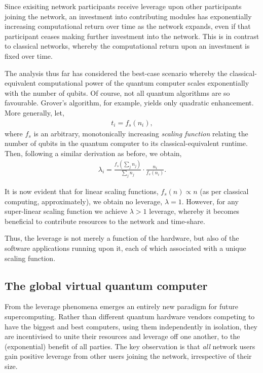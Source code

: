 \documentclass[aps,rmp,twocolumn,amsmath,amssymb,nofootinbib,superscriptaddress,longbibliography,floatfix,table-of-contents,eqsecnum]{revtex4-1}
\begin{document}
Since exisiting network participants receive leverage upon other participants joining the network, an investment into contributing modules has exponentially increasing computational return over time as the network expands, even if that participant ceases making further investment into the network. This is in contrast to classical networks, whereby the computational return upon an investment is fixed over time.

The analysis thus far has considered the best-case scenario whereby the classical-equivalent computational power of the quantum computer scales exponentially with the number of qubits. Of course, not all quantum algorithms are so favourable. Grover's algorithm, for example, yields only quadratic enhancement. More generally, let,
\begin{align}
t_i = f_s(n_i),
\end{align}
where $f_s$ is an arbitrary, monotonically increasing \emph{scaling function} relating the number of qubits in the quantum computer to its classical-equivalent runtime. Then, following a similar derivation as before, we obtain,
\begin{align}
\lambda_i = \frac{f_s\left(\sum_{j} n_j\right)}{\sum_j n_j} \cdot \frac{n_i}{f_s(n_i)}.
\end{align}

It is now evident that for linear scaling functions, \mbox{$f_s(n)\propto n$} (as per classical computing, approximately), we obtain no leverage, \mbox{$\lambda=1$}. However, for any super-linear scaling function we achieve \mbox{$\lambda>1$} leverage, whereby it becomes beneficial to contribute resources to the network and time-share.

Thus, the leverage is not merely a function of the hardware, but also of the software applications running upon it, each of which associated with a unique scaling function.

%
%

\subsection{The global virtual quantum computer} \label{sec:GVQC} 

From the leverage phenomena emerges an entirely new paradigm for future supercomputing. Rather than different quantum hardware vendors competing to have the biggest and best computers, using them independently in isolation, they are incentivised to unite their resources and leverage off one another, to the (exponential) benefit of all parties. The key observation is that \textit{all} network users gain positive leverage from other users joining the network, irrespective of their size.
\end{document}
